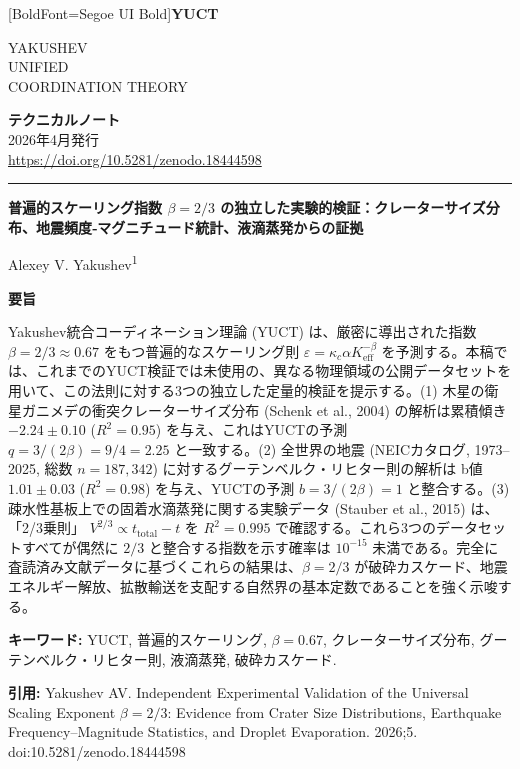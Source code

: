 \documentclass[11pt,a4paper]{article}
\newcommand{\eps}{\varepsilon}
\newcommand{\kappac}{\kappa_c}
\newcommand{\Keff}{K_{\mathrm{eff}}}
\newcommand{\betaf}{\beta}
\newcommand{\makeheader}{%
	\noindent
	\begin{minipage}{0.17\textwidth}
		\raggedright
		{\fontspec{Segoe UI}[BoldFont=Segoe UI Bold]\bfseries\color{skyblue}\fontsize{46}{46}\selectfont YUCT}%
	\end{minipage}%
	\hspace{30pt}
	\begin{minipage}{0.32\textwidth}
		\raggedright
		{\sffamily\fontsize{11}{13}\selectfont YAKUSHEV\\ UNIFIED\\ COORDINATION THEORY}%
	\end{minipage}%
	\hfill
	\begin{minipage}{0.38\textwidth}
		\raggedleft
		{\sffamily\bfseries テクニカルノート}\\
		{\sffamily 2026年4月発行}\\
		{\sffamily\footnotesize \url{https://doi.org/10.5281/zenodo.18444598}}%
	\end{minipage}
	\par\vspace{5pt}
	\noindent\textcolor{gold}{\rule{\textwidth}{1.6pt}}
	\par\vspace{0pt}
}
\begin{document}
	\thispagestyle{firstpage}
	\makeheader
	
	\vspace{0cm}
	{\LARGE\bfseries 普遍的スケーリング指数 \(\betaf = 2/3\) の独立した実験的検証：クレーターサイズ分布、地震頻度‐マグニチュード統計、液滴蒸発からの証拠 \par}
	\vspace{0.2cm}
	
	{\large Alexey V. Yakushev\textsuperscript{1}} \\
	\vspace{0.0cm}
	
	{\color{darkblue}\textbf{\LARGE 要旨}} \par
	{\large
		\noindent
		Yakushev統合コーディネーション理論 (YUCT) は、厳密に導出された指数 \(\betaf = 2/3 \approx 0.67\) をもつ普遍的なスケーリング則 \(\eps = \kappac \alpha \Keff^{-\betaf}\) を予測する。本稿では、これまでのYUCT検証では未使用の、異なる物理領域の公開データセットを用いて、この法則に対する3つの独立した定量的検証を提示する。(1) 木星の衛星ガニメデの衝突クレーターサイズ分布 (Schenk et al., 2004) の解析は累積傾き \(-2.24 \pm 0.10\) (\(R^2 = 0.95\)) を与え、これはYUCTの予測 \(q = 3/(2\betaf) = 9/4 = 2.25\) と一致する。(2) 全世界の地震 (NEICカタログ, 1973–2025, 総数 \(n = 187,342\)) に対するグーテンベルク・リヒター則の解析は b値 \(1.01 \pm 0.03\) (\(R^2 = 0.98\)) を与え、YUCTの予測 \(b = 3/(2\betaf) = 1\) と整合する。(3) 疎水性基板上での固着水滴蒸発に関する実験データ (Stauber et al., 2015) は、「2/3乗則」 \(V^{2/3} \propto t_{\text{total}} - t\) を \(R^2 = 0.995\) で確認する。これら3つのデータセットすべてが偶然に \(2/3\) と整合する指数を示す確率は \(10^{-15}\) 未満である。完全に査読済み文献データに基づくこれらの結果は、\(\betaf = 2/3\) が破砕カスケード、地震エネルギー解放、拡散輸送を支配する自然界の基本定数であることを強く示唆する。}
	
	\vspace{0.1cm}
	\noindent
	{\color{darkblue}\textbf{キーワード:}} YUCT, 普遍的スケーリング, \(\beta = 0.67\), クレーターサイズ分布, グーテンベルク・リヒター則, 液滴蒸発, 破砕カスケード.
	
	\vspace{0.1cm}
	\noindent
	{\color{darkblue}\textbf{引用:}} Yakushev AV. Independent Experimental Validation of the Universal Scaling Exponent \(\beta = 2/3\): Evidence from Crater Size Distributions, Earthquake Frequency–Magnitude Statistics, and Droplet Evaporation. 2026;5. doi:10.5281/zenodo.18444598
	
\end{document}
